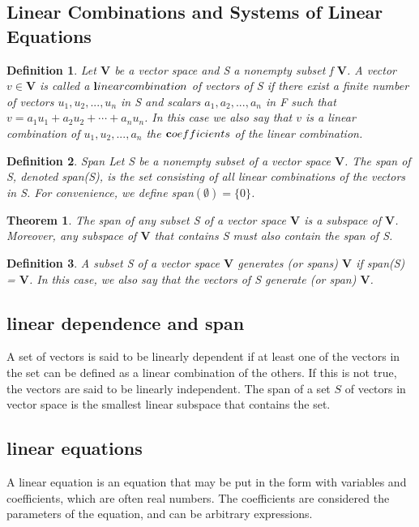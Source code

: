 \documentclass[11pt]{article}
\newtheorem {thm}{Theorem}
\newtheorem{definition}{Definition}
\begin{document}
\subsection{Linear Combinations and Systems of Linear Equations}

\begin{definition}
Let $\textbf{V}$ be a vector space and S a nonempty subset f $\textbf{V}$. A vector $v \in \textbf{V}$ is called a $\textbf linear combination$ of vectors of S if there exist a finite number of vectors $u_1, u_2, ..., u_n$ in S and scalars $a_1, a_2, ..., a_n$ in F such that $v = a_1u_1 + a_2u_2 + \cdots + a_nu_n$. In this case we also say that $v$ is a linear combination of $u_1, u_2, ..., a_n$ the $\textbf coefficients$ of the linear combination.
\end{definition}

\begin{definition}{Span}
Let S be a nonempty subset of a vector space $\textbf{V}$. The span of S, denoted span(S), is the set consisting of all linear combinations of the vectors in S. For convenience, we define span$(\emptyset) = \{0\}$.
\end{definition}

\begin{thm}
The span of any subset S of a vector space $\textbf{V}$ is a subspace of $\textbf{V}$. Moreover, any subspace of $\textbf{V}$ that contains S must also contain the span of S.
\end{thm}

\begin{definition}
A subset S of a vector space $\textbf{V}$ generates (or spans) $\textbf{V}$ if span(S) = $\textbf{V}$. In this case, we also say that the vectors of S generate (or span) $\textbf{V}$.
\end{definition}

\subsection{linear dependence and span}
A set of vectors is said to be linearly dependent if at least one of the vectors in the set can be defined as a linear combination of the others. If this is not true, the vectors are said to be linearly independent.
\newline
\newline
The span of a set $S$ of vectors in vector space is the smallest linear subspace that contains the set.

\subsection{linear equations}
A linear equation is an equation that may be put in the form with variables and coefficients, which are often real numbers.
The coefficients are considered the parameters of the equation, and can be arbitrary expressions.
\end{document}
